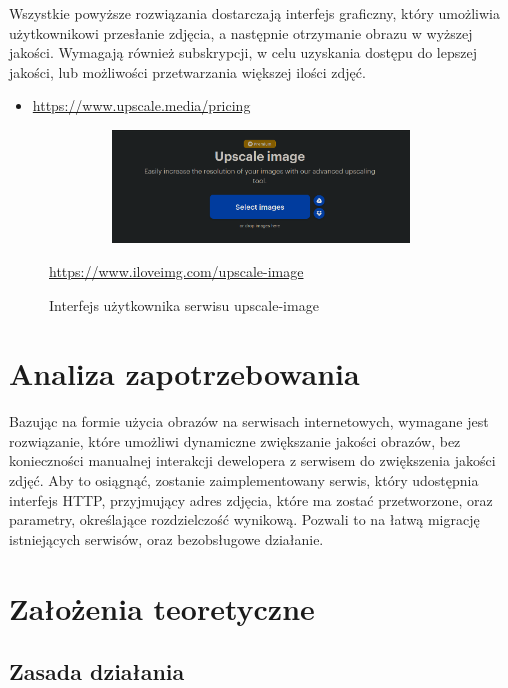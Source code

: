 Wszystkie powyższe rozwiązania dostarczają interfejs graficzny, który umożliwia użytkownikowi przesłanie zdjęcia, a następnie otrzymanie obrazu w wyższej jakości.
\newline
Wymagają również subskrypcji, w celu uzyskania dostępu do lepszej jakości, lub możliwości przetwarzania większej ilości zdjęć.
\begin{itemize}
	\item \href{https://www.upscale.media/pricing}{https://www.upscale.media/pricing}
\end{itemize}
\begin{figure}
	\center
	\includegraphics[width=13.0cm, height=3.0cm]{figures/upscale}
	\caption{Interfejs użytkownika serwisu upscale-image}
	\href{https://www.iloveimg.com/upscale-image}{https://www.iloveimg.com/upscale-image}
\end{figure}

\chapter{Analiza zapotrzebowania}

Bazując na formie użycia obrazów na serwisach internetowych, wymagane jest rozwiązanie, które umożliwi dynamiczne zwiększanie jakości obrazów, bez konieczności manualnej interakcji dewelopera z serwisem do zwiększenia jakości zdjęć.
\newline
Aby to osiągnąć, zostanie zaimplementowany serwis, który udostępnia interfejs HTTP, przyjmujący adres zdjęcia, które ma zostać przetworzone, oraz parametry, określające rozdzielczość wynikową.
\newline
Pozwali to na łatwą migrację istniejących serwisów, oraz bezobsługowe działanie.

\chapter{Założenia teoretyczne}

\section{Zasada działania}

